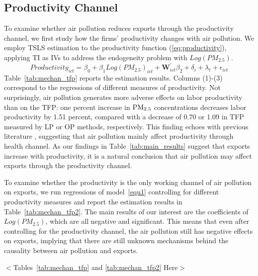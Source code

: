 \documentclass[12pt]{article}
\begin{document}
\subsection{Productivity Channel} \label{sec:6.1}
  To examine whether air pollution reduces exports through the productivity channel, we first study how the firms' productivity changes with air pollution. We employ TSLS estimation to the productivity function (\ref{eq:productivity}), applying TI as IVs to address the endogeneity problem with $Log(PM_{2.5})$.
  \begin{equation}\label{eq:productivity}
    Productivity_{ict} = \beta_{0} + \beta_{1} Log(PM_{2.5})_{ict} + \mathbf{W}_{ict}^{\prime} \beta_{2}%
     + \delta_{i} + \lambda_{t} + \epsilon_{ict}
  \end{equation}
Table~\ref{tab:mechan_tfp} reports the estimation results. Columns (1)-(3) correspond to the regressions of different measures of productivity. Not surprisingly, air pollution generates more adverse effects on labor productivity than on the TFP: one
  percent increase in $\rm PM_{2.5}$ concentrations decreases labor productivity by
  1.51 percent, compared with a decrease of 0.70 or 1.09 in TFP measured by LP or OP methods, respectively. This finding echoes with previous literature \citep{fu2021air,somanathan2021impact,chang2016particulate,Adhvaryu2022}, suggesting that air pollution mainly affect productivity through health channel.  As our findings in Table~\ref{tab:main_results} suggest that exports increase with productivity, it is a natural conclusion that air pollution may affect exports through the productivity channel. 
  
  To examine whether the productivity is the only working channel of air pollution on exports, we run regressions of model~\ref{equ1} controlling for different productivity measures and report the estimation results in Table~\ref{tab:mechan_tfp2}. The main results of our interest are the coefficients of $Log(PM_{2.5})$, which are all negative and significant. This means that even after controlling for the productivity channel, the air pollution still has negative effects on exports, implying that there are still unknown mechanisms behind the causality between air pollution and exports. 
  
  \begin{center}
  $<$Tables~\ref{tab:mechan_tfp} and \ref{tab:mechan_tfp2} Here$>$
  \end{center}
\end{document}
